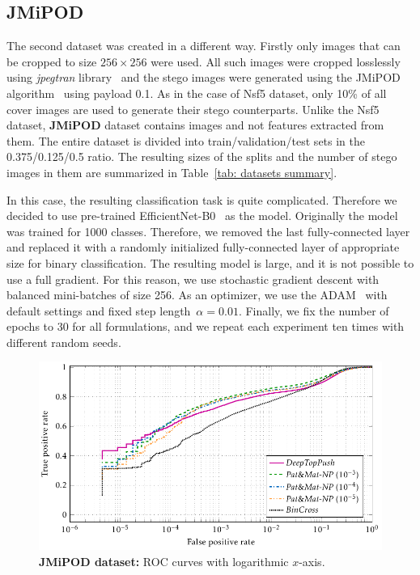 \subsection{JMiPOD}

The second dataset was created in a different way. Firstly only images that can be cropped to size $256 \times 256$ were used. All such images were cropped losslessly using \emph{jpegtran} library~\cite{libjpeg2014} and the stego images were generated using the JMiPOD algorithm~\cite{cogranne2020steganography} using payload 0.1. As in the case of Nsf5 dataset, only 10\% of all cover images are used to generate their stego counterparts. Unlike the Nsf5 dataset, \textbf{JMiPOD} dataset contains images and not features extracted from them. The entire dataset is divided into train/validation/test sets in the 0.375/0.125/0.5 ratio. The resulting sizes of the splits and the number of stego images in them are summarized in Table~\ref{tab: datasets summary}. 

In this case, the resulting classification task is quite complicated. Therefore we decided to use pre-trained EfficientNet-B0~\cite{tan2019efficientnet} as the model. Originally the model was trained for 1000 classes. Therefore, we removed the last fully-connected layer and replaced it with a randomly initialized fully-connected layer of appropriate size for binary classification. The resulting model is large, and it is not possible to use a full gradient. For this reason, we use stochastic gradient descent with balanced mini-batches of size 256. As an optimizer, we use the ADAM~\cite{kingma2014adam} with default settings and fixed step length~$\alpha = 0.01.$ Finally, we fix the number of epochs to 30 for all formulations, and we repeat each experiment ten times with different random seeds.

\begin{figure}[!t]
  \centering
  \includegraphics{images/stego_jmipod.pdf}
  \caption{\textbf{JMiPOD dataset:} ROC curves with logarithmic $x$-axis.}
  \label{fig: steganalysis jmipod}
\end{figure}

